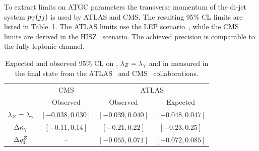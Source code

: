 \begin{table}[htp]
\begin{center}
\caption{Summary of measured total $\WZ+\WW$ production cross sections from ATLAS and CMS
at 7 TeV center-of-mass energies in the \WVlvqq\; final state.}
\end{center}
\label{tab:sss-lvjjVVprod-xsec}
\end{table}

%

To extract limits on ATGC parameters the transverse momentum of the di-jet system $p_{\mathrm{T}}(jj)$ is used 
by ATLAS and CMS. The resulting 95\% CL limits are listed in Table~\ref{tab:sss-lvjjVVprod-ATGC}. The ATLAS
limits use the LEP scenario~\cite{Gounaris:1996rz}, while the CMS limits are derived in the HISZ~\cite{HAGIWARA1992353,PhysRevD.48.2182} scenario. The achieved precision is comparable to the fully leptonic
channel.

\begin{table}\centering
\begin{tabular}{cccc}
\hline
 & CMS & \multicolumn{2}{c}{ATLAS}   \\ 
 & Observed & Observed & Expected \\
\hline
$\lambda_Z=\lambda_\gamma$ & $[-0.038, 0.030]$ & $[-0.039, 0.040]$ & $[-0.048, 0.047]$ \\
$\Delta \kappa_\gamma$ 	  & $[-0.11, 0.14]$ & $[-0.21,0.22]$ & $[-0.23,0.25]$ \\
$\Delta g_1^Z$   & \--- & $[-0.055, 0.071]$ & $[-0.072, 0.085]$ \\
\hline
\end{tabular}
\caption{Expected and observed 95\% CL on \dkg, $\lambda_Z=\lambda_\gamma$ and \dgz in measured in the 
\WVlvqq\; final state from the ATLAS~\cite{Aad:2014mda} and CMS~\cite{Chatrchyan:2012bd} 
collaborations.}
\label{tab:sss-lvjjVVprod-ATGC}
\end{table}


